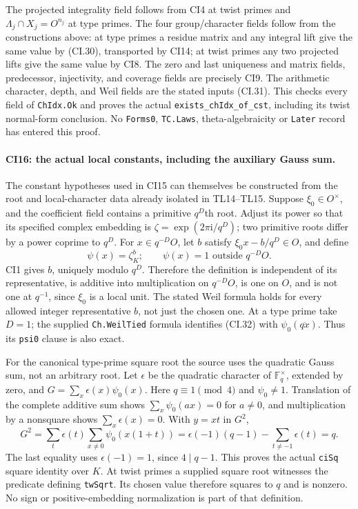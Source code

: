 The projected integrality field follows from CI4 at twist
primes and $\Lambda_j\cap X_j=O^{n_j}$ at type primes.
The four group/character fields follow from the constructions
above: at type primes a residue matrix and any integral lift
give the same value by (CI.30), transported by CI14; at twist
primes any two projected lifts give the same value by CI8.
The zero and last uniqueness and matrix fields, predecessor,
injectivity, and coverage fields are precisely CI9. The
arithmetic character, depth, and Weil fields are the stated
inputs (CI.31). This checks every field of
\texttt{ChIdx.Ok} and proves the actual
\texttt{exists\_chIdx\_of\_cst}, including its twist normal-form
conclusion. No \texttt{Forms0}, \texttt{TC.Laws}, theta-algebraicity
or \texttt{Later} record has entered this proof.

\paragraph{CI16: the actual local constants, including the auxiliary Gauss sum.}
The constant hypotheses used in CI15 can themselves be
constructed from the root and local-character data already
isolated in TL14--TL15. Suppose $\xi_0\in O^\times$, and the
coefficient field contains a primitive $q^D$th root. Adjust its
power so that its specified complex embedding is
$\zeta=\exp(2\pi\mathrm i/q^D)$; two primitive roots differ by
a power coprime to $q^D$. For $x\in q^{-D}O$, let $b$ satisfy
$\xi_0x-b/q^D\in O$, and define
\[
 \psi(x)=\zeta_K^b;
 \qquad\psi(x)=1\text{ outside }q^{-D}O.
 \tag{CI.32}
\]
CI1 gives $b$, uniquely modulo $q^D$. Therefore the definition
is independent of its representative, is additive into
multiplication on $q^{-D}O$, is one on $O$, and is not one at
$q^{-1}$, since $\xi_0$ is a local unit. The stated Weil formula
holds for every allowed integer representative $b$, not just
the chosen one. At a type prime take $D=1$; the supplied
\texttt{Ch.WeilTied} formula identifies (CI.32) with
$\psi_0(\overline{qx})$. Thus its \texttt{psi0} clause is also exact.

For the canonical type-prime square root the source uses the
quadratic Gauss sum, not an arbitrary root. Let $\epsilon$ be
the quadratic character of $\mathbb F_q^\times$, extended by
zero, and $G=\sum_x\epsilon(x)\psi_0(x)$. Here $q\equiv1\pmod4$
and $\psi_0\ne1$. Translation of the complete additive sum
shows $\sum_x\psi_0(ax)=0$ for $a\ne0$, and multiplication by
a nonsquare shows $\sum_x\epsilon(x)=0$. With $y=xt$ in $G^2$,
\[
 G^2=\sum_t\epsilon(t)\sum_{x\ne0}\psi_0(x(1+t))
     =\epsilon(-1)(q-1)-\sum_{t\ne-1}\epsilon(t)=q.
 \tag{CI.33}
\]
The last equality uses $\epsilon(-1)=1$, since $4\mid q-1$.
This proves the actual \texttt{ciSq} square identity over $K$.
At twist primes a supplied square root witnesses the predicate
defining \texttt{twSqrt}. Its chosen value therefore squares to
$q$ and is nonzero. No sign or positive-embedding normalization
is part of that definition.

